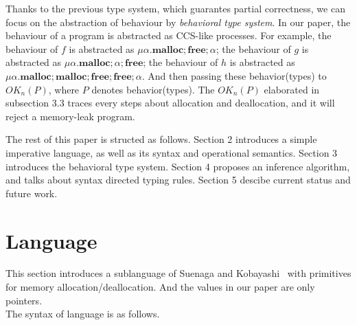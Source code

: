 \documentclass[english]{jssst_ppl} %
\newcommand\Malloc{\mathbf{malloc}}
\newcommand\Free{\mathbf{free}}
\begin{document}
Thanks to the previous type system, which guarantes partial correctness, we can focus on the abstraction of behaviour by \emph{behavioral type system}. In our paper, the behaviour of a program is abstracted as CCS-like processes. For example, the behaviour of $f$ is abstracted as $\mu \alpha. \Malloc;\Free;\alpha$; the behaviour of $g$ is abstracted as $\mu \alpha. \Malloc;\alpha;\Free$; the behaviour of $h$ is abstracted as $\mu \alpha. \Malloc;\Malloc;\Free;\Free;\alpha$. And then passing these behavior(types) to $OK_{n}(P)$, where $P$ denotes  behavior(types). The $OK_{n}(P)$ elaborated in subsection 3.3 traces every steps about allocation and deallocation, and it will reject a memory-leak program.

The rest of this paper is structed as follows. Section 2 introduces a simple imperative language, as well as its syntax and operational semantics. Section 3 introduces the behavioral type system. Section 4 proposes an inference algorithm, and talks about syntax directed typing rules. Section 5 descibe current status and future work.

\section{Language}
This section introduces a sublanguage of Suenaga and Kobayashi~\cite{DBLP:conf/aplas/SuenagaK09} with primitives for memory allocation/deallocation. And the values in our paper are only pointers. \\
The syntax of language is as follows.
\end{document}
